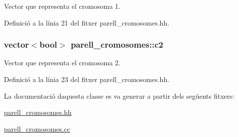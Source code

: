 Vector que representa el cromosoma 1. 



Definició a la línia 21 del fitxer parell\+\_\+cromosomes.\+hh.

\subsubsection[{\texorpdfstring{c2}{c2}}]{\setlength{\rightskip}{0pt plus 5cm}vector$<$bool$>$ parell\+\_\+cromosomes\+::c2\hspace{0.3cm}{\ttfamily [private]}}\hypertarget{classparell__cromosomes_a888f09ecbc3329b0ee505fb0cb8bf98f}{}\label{classparell__cromosomes_a888f09ecbc3329b0ee505fb0cb8bf98f}


Vector que representa el cromosoma 2. 



Definició a la línia 23 del fitxer parell\+\_\+cromosomes.\+hh.



La documentació d\textquotesingle{}aquesta classe es va generar a partir dels següents fitxers\+:\begin{DoxyCompactItemize}
\item 
\hyperlink{parell__cromosomes_8hh}{parell\+\_\+cromosomes.\+hh}\item 
\hyperlink{parell__cromosomes_8cc}{parell\+\_\+cromosomes.\+cc}\end{DoxyCompactItemize}
